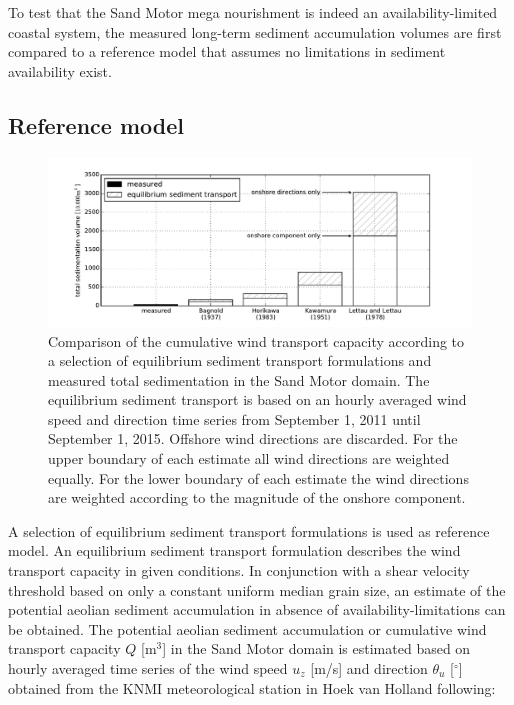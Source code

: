 To test that the Sand Motor mega nourishment is indeed an
availability-limited coastal system, the measured long-term sediment
accumulation volumes \citep{Hoonhout2017a} are first compared to a
reference model that assumes no limitations in sediment availability
exist.

\subsection{Reference model}

\begin{figure}
  \centering
  \includegraphics[width=\columnwidth]{../Figures/transport_models}
  \caption{Comparison of the cumulative wind transport capacity
    according to a selection of equilibrium sediment transport
    formulations and measured total sedimentation in the Sand Motor
    domain. The equilibrium sediment transport is based on an hourly
    averaged wind speed and direction time series from September 1,
    2011 until September 1, 2015. Offshore wind directions are
    discarded. For the upper boundary of each estimate all wind
    directions are weighted equally. For the lower boundary of each
    estimate the wind directions are weighted according to the
    magnitude of the onshore component.}
  \label{fig:models}
\end{figure}

A selection of equilibrium sediment transport formulations is used as
reference model. An equilibrium sediment transport formulation
describes the wind transport capacity in given conditions. In
conjunction with a shear velocity threshold based on only a constant
uniform median grain size, an estimate of the potential aeolian
sediment accumulation in absence of availability-limitations can be
obtained. The potential aeolian sediment accumulation or cumulative
wind transport capacity $Q$ [$\mathrm{m^3}$] in the Sand Motor domain
is estimated based on hourly averaged time series of the wind speed
$u_z$ [m/s] and direction $\theta_u$ [$^{\circ}$] obtained from the
KNMI meteorological station in Hoek van Holland following:

